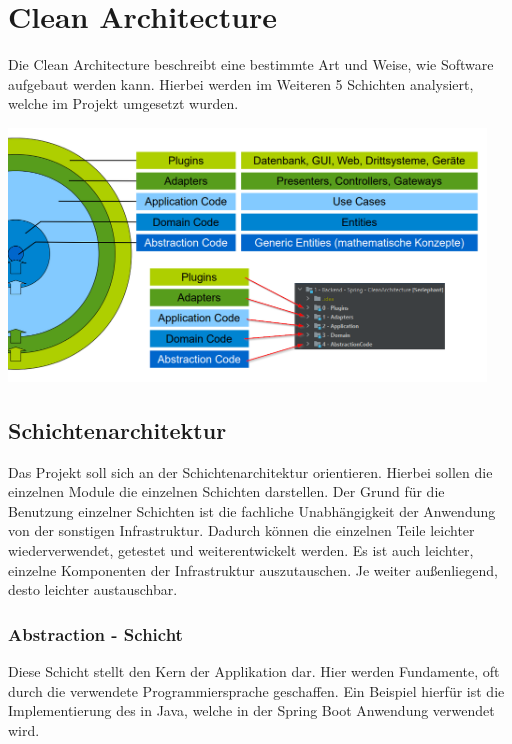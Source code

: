 
\chapter{Clean Architecture}
\label{cleanArchitecture}
    Die Clean Architecture beschreibt eine bestimmte Art und Weise, wie Software aufgebaut werden kann. Hierbei werden im Weiteren 5 Schichten analysiert, welche im Projekt umgesetzt wurden.
    
    \includegraphics[width=0.95\textwidth]{zfiles/Bilder/schichten.png}

    \section{Schichtenarchitektur}
     Das Projekt soll sich an der Schichtenarchitektur orientieren. Hierbei sollen die einzelnen Module die einzelnen Schichten darstellen. Der Grund für die Benutzung einzelner Schichten ist die fachliche Unabhängigkeit der Anwendung von der sonstigen Infrastruktur. Dadurch können die einzelnen Teile leichter wiederverwendet, getestet und weiterentwickelt werden. Es ist auch leichter, einzelne Komponenten der Infrastruktur auszutauschen. Je weiter außenliegend, desto leichter austauschbar.
    
        \subsection{Abstraction - Schicht}
    	Diese Schicht stellt den Kern der Applikation dar. Hier werden Fundamente, oft durch die verwendete Programmiersprache geschaffen. Ein Beispiel hierfür ist die Implementierung des  in Java, welche in der Spring Boot Anwendung verwendet wird.
